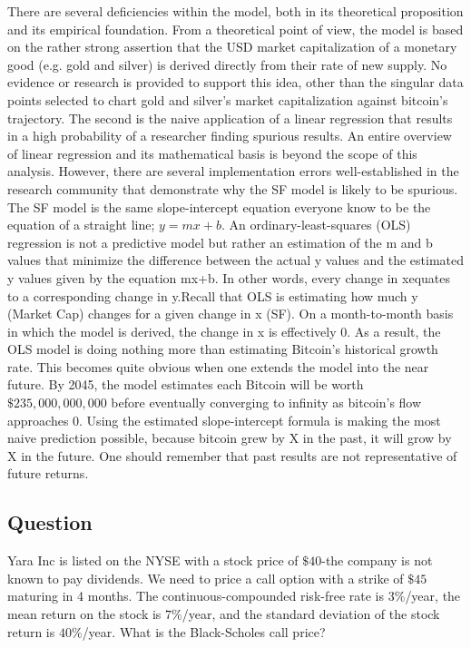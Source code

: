 \documentclass{article}
\begin{document}
There are several deficiencies within the model, both in its theoretical proposition and its empirical foundation.
From a theoretical point of view, the model is based on the rather strong assertion that the USD market capitalization of a monetary good (e.g. gold and silver) is derived directly from their rate of new supply. No evidence or research is provided to support this idea, other than the singular data points selected to chart gold and silver’s market capitalization against bitcoin’s trajectory. 
The second is the naive application of a linear regression that results in a high probability of a researcher finding spurious results. An entire overview of linear regression and its mathematical basis is beyond the scope of this analysis. However, there are several implementation errors well-established in the research community that demonstrate why the SF model is likely to be spurious.
The SF model is the same slope-intercept equation everyone know to be the equation of a straight line; $y = mx + b$. An ordinary-least-squares (OLS) regression is not a predictive model but rather an estimation of the m and b values that minimize the difference between the actual y values and the estimated y values given by the equation mx+b. In other words, every change in xequates to a corresponding change in y.Recall that OLS is estimating how much y (Market Cap) changes for a given change in x (SF). On a month-to-month basis in which the model is derived, the change in x is effectively 0. As a result, the OLS model is doing nothing more than estimating Bitcoin’s historical growth rate. This becomes quite obvious when one extends the model into the near future. By 2045, the model estimates each Bitcoin will be worth $\$235,000,000,000$ before eventually converging to infinity as bitcoin’s flow approaches 0.
Using the estimated slope-intercept formula is making the most naive prediction possible, because bitcoin grew by X in the past, it will grow by X in the future. One should remember that past results are not representative of future returns.


\subsection{Question}
Yara Inc is listed on the NYSE with a stock price of $\$40$-the company is not known to pay dividends. We need to price a call option with a strike of $\$45$ maturing in 4 months. The continuous-compounded risk-free rate is $3\%$/year, the mean return on the stock is $7\%$/year, and the standard deviation of the stock return is $40\%$/year. What is the Black-Scholes call price? \\
\end{document}
